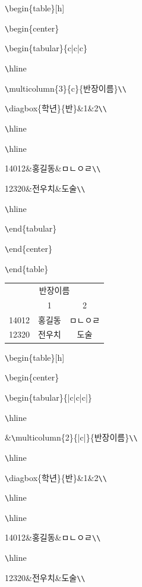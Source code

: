 \documentclass[11pt]{article}
\begin{document}
\longline

\verb+\+begin\{table\}[h]

\verb+\+begin\{center\}

\verb+\+begin\{tabular\}\{c|c|c\}

\verb+\+hline

\verb+\+multicolumn\{3\}\{c\}\{반장이름\}\verb+\+\verb+\+

\verb+\+diagbox\{학년\}\{반\}\&1\&2\verb+\+\verb+\+

\verb+\+hline

\verb+\+hline

14012\&홍길동\&ㅁㄴㅇㄹ\verb+\+\verb+\+

12320\&전우치\&도술\verb+\+\verb+\+

\verb+\+hline

\verb+\+end\{tabular\}

\verb+\+end\{center\}

\verb+\+end\{table\}

\begin{table}[!h]
	\begin{center}
	\begin{tabular}{c|c|c}
		\hline
		\multicolumn{3}{c}{반장이름}\\
		\diagbox{학년}{반}&1&2\\
		\hline
		\hline
		14012&홍길동&ㅁㄴㅇㄹ\\
		12320&전우치&도술\\
		\hline
		
	\end{tabular}
	\end{center}
\end{table}

\longline

\verb+\+begin\{table\}[h]

\verb+\+begin\{center\}

\verb+\+begin\{tabular\}\{|c|c|c|\}

\verb+\+hline

\&\verb+\+multicolumn\{2\}\{|c|\}\{반장이름\}\verb+\+\verb+\+

\verb+\+hline

\verb+\+diagbox\{학년\}\{반\}\&1\&2\verb+\+\verb+\+

\verb+\+hline

\verb+\+hline

14012\&홍길동\&ㅁㄴㅇㄹ\verb+\+\verb+\+

\verb+\+hline

12320\&전우치\&도술\verb+\+\verb+\+
\end{document}
